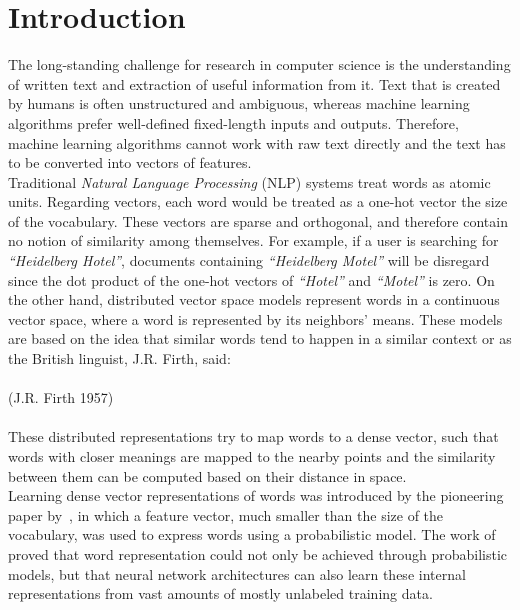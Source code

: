 \chapter{Introduction}\label{chap:intro}
The long-standing challenge for research in computer science is the understanding of written text and extraction of useful information from it. Text that is created by humans is often unstructured and ambiguous, whereas machine learning algorithms prefer well-defined fixed-length inputs and outputs. Therefore, machine learning algorithms cannot work with raw text directly and the text has to be converted into vectors of features.
\\
\noindent
Traditional \emph{Natural Language Processing} (NLP) systems treat words as atomic units. Regarding vectors, each word would be treated as a one-hot vector the size of the vocabulary. These vectors are sparse and orthogonal, and therefore contain no notion of similarity among themselves. For example, if a user is searching for \emph{``Heidelberg Hotel''}, documents containing \emph{``Heidelberg Motel''} will be disregard since the dot product of the one-hot vectors of \emph{``Hotel''} and \emph{``Motel''} is zero. On the other hand, distributed vector space models represent words in a continuous vector space, where a word is represented by its neighbors' means. These models are based on the idea that similar words tend to happen in a similar context or as the British linguist, J.R. Firth, said:
\\
\\
\noindent
{} (J.R. Firth 1957)\\
\\
\noindent
These distributed representations try to map words to a dense vector, such that words with closer meanings are mapped to the nearby points and the similarity between them can be computed based on their distance in space.
\\
\noindent 
Learning dense vector representations of words was introduced by the pioneering paper by~, in which a feature vector, much smaller than the size of the vocabulary, was used to express words using a probabilistic model. The work of~ proved that word representation could not only be achieved through probabilistic models, but that neural network architectures can also learn these internal representations from vast amounts of mostly unlabeled training data.
